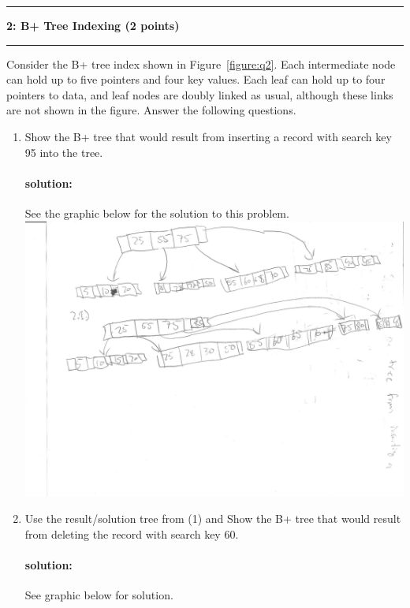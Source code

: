 \documentclass[11pt]{article}
\newcommand\question[2]{\vspace{.25in}\hrule\textbf{#1: #2}\vspace{.5em}\hrule\vspace{.10in}}
\begin{document}
\question{2}{B+ Tree Indexing (2 points)}
Consider the B+ tree index shown in Figure~\ref{figure:q2}. 
Each intermediate node can hold up to five pointers and four key values. Each leaf can hold up to four pointers to data, and leaf nodes are doubly linked as usual, although these links are not shown in the figure.
Answer the following questions.\\

\begin{enumerate}
	\item Show the B+ tree that would result from inserting a record with search key 95 into the tree.
	\paragraph{solution:} \hfill \break
	See the graphic below for the solution to this problem.\\
	
	\includegraphics{twoPointOne.png}

	\item Use the result/solution tree from (1) and Show the B+ tree that would result from deleting the record with search key 60.
		\paragraph{solution:} \hfill \break
		See graphic below for solution.\\
		

\end{enumerate}
\end{document}
